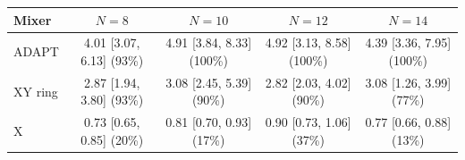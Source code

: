 \begin{tabular}{lcccc}
\toprule
Mixer & $N=8$ & $N=10$ & $N=12$ & $N=14$ \\
\midrule
ADAPT & 4.01 [3.07, 6.13] (93\%) & 4.91 [3.84, 8.33] (100\%) & 4.92 [3.13, 8.58] (100\%) & 4.39 [3.36, 7.95] (100\%) \\
XY ring & 2.87 [1.94, 3.80] (93\%) & 3.08 [2.45, 5.39] (90\%) & 2.82 [2.03, 4.02] (90\%) & 3.08 [1.26, 3.99] (77\%) \\
X & 0.73 [0.65, 0.85] (20\%) & 0.81 [0.70, 0.93] (17\%) & 0.90 [0.73, 1.06] (37\%) & 0.77 [0.66, 0.88] (13\%) \\
\bottomrule
\end{tabular}
